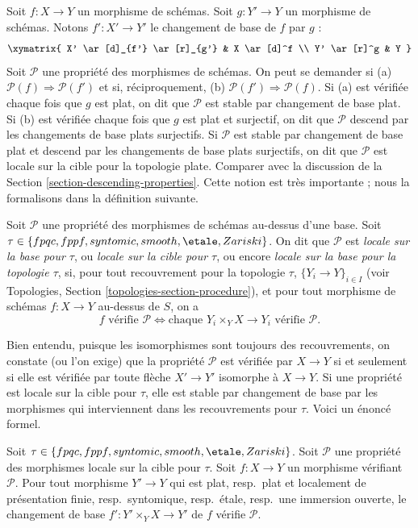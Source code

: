 \noindent
Soit $f : X \to Y$ un morphisme de schémas. Soit $g : Y' \to Y$ un
morphisme de schémas. Notons $f' : X' \to Y'$ le changement de base de $f$
par $g$ :
$$
\xymatrix{
X' \ar[d]_{f'} \ar[r]_{g'} & X \ar[d]^f \\
Y' \ar[r]^g & Y
}
$$
Soit $\mathcal{P}$ une propriété des morphismes de schémas. On peut se
demander si (a) $\mathcal{P}(f) \Rightarrow \mathcal{P}(f')$ et si,
réciproquement, (b) $\mathcal{P}(f') \Rightarrow \mathcal{P}(f)$. Si (a) est
vérifiée chaque fois que $g$ est plat, on dit que $\mathcal{P}$ est stable
par changement de base plat. Si (b) est vérifiée chaque fois que $g$ est plat
et surjectif, on dit que $\mathcal{P}$ descend par les changements de base
plats surjectifs. Si $\mathcal{P}$ est stable par changement de base plat et
descend par les changements de base plats surjectifs, on dit que
$\mathcal{P}$ est locale sur la cible pour la topologie plate. Comparer avec
la discussion de la Section \ref{section-descending-properties}. Cette notion
est très importante ; nous la formalisons dans la définition suivante.

\begin{definition}
\label{definition-property-morphisms-local}
Soit $\mathcal{P}$ une propriété des morphismes de schémas au-dessus d'une
base. Soit $\tau \in \{fpqc, fppf, syntomic, smooth, \etale, Zariski\}$.
On dit que $\mathcal{P}$ est {\it locale sur la base pour $\tau$}, ou
{\it locale sur la cible pour $\tau$}, ou encore {\it locale sur la base
pour la topologie $\tau$}, si, pour tout recouvrement pour la topologie
$\tau$, $\{Y_i \to Y\}_{i \in I}$ (voir Topologies, Section
\ref{topologies-section-procedure}), et pour tout morphisme de schémas
$f : X \to Y$ au-dessus de $S$, on a
$$
f \text{ vérifie }\mathcal{P}
\Leftrightarrow
\text{chaque }Y_i \times_Y X \to Y_i\text{ vérifie }\mathcal{P}.
$$
\end{definition}

\noindent
Bien entendu, puisque les isomorphismes sont toujours des recouvrements, on
constate (ou l'on exige) que la propriété $\mathcal{P}$ est vérifiée par
$X \to Y$ si et seulement si elle est vérifiée par toute flèche
$X' \to Y'$ isomorphe à $X \to Y$. Si une propriété est locale sur la cible
pour $\tau$, elle est stable par changement de base par les morphismes qui
interviennent dans les recouvrements pour $\tau$. Voici un énoncé formel.

\begin{lemma}
\label{lemma-pullback-property-local-target}
Soit $\tau \in \{fpqc, fppf, syntomic, smooth, \etale, Zariski\}$.
Soit $\mathcal{P}$ une propriété des morphismes locale sur la cible pour
$\tau$. Soit $f : X \to Y$ un morphisme vérifiant $\mathcal{P}$. Pour tout
morphisme $Y' \to Y$ qui est plat, resp.\ plat et localement de présentation
finie, resp.\ syntomique, resp.\ \'etale, resp.\ une immersion ouverte, le
changement de base $f' : Y' \times_Y X \to Y'$ de $f$ vérifie
$\mathcal{P}$.
\end{lemma}

